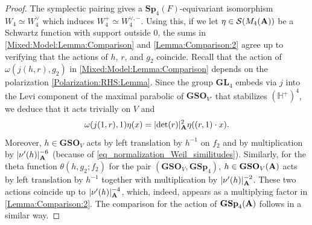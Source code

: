 \documentclass[11pt, reqno]{amsart}
\theoremstyle{plain}
\theoremstyle{definition}
\theoremstyle{remark}
\theoremstyle{plain}
\def\A{{\bf A}}
\def\GSp{{\mathbf{GSp}}}
\def\Sp{{\mathbf{Sp}}}
\def\GL{\mathbf{GL}}
\begin{document}
\begin{proof}
The symplectic pairing gives a $\Sp_4(F)$-equivariant isomorphism $W_4 \simeq W_4^\vee$ which induces $W_4^+ \simeq W_4^{\vee,-}$. Using this, if we let $\eta \in \mathcal{S}(M_4(\A))$ be a Schwartz function with support outside $0$, the sums in  
    \eqref{Mixed:Model:Lemma:Comparison} and \eqref{Lemma:Comparison:2} agree up to verifying that the actions of $h$, $r$, and $g_2$ coincide. Recall that the action of $\omega(j(h,r),g_2)$ in  
    \eqref{Mixed:Model:Lemma:Comparison} depends on the polarization \eqref{Polarization:RHS:Lemma}. Since the group $\GL_4$ embeds via $j$ into the Levi component of the maximal parabolic of $\mathbf{GSO}_{V'}$ that stabilizes $(\mathbb{H}^{+})^4$, we deduce that it acts trivially on $V$ and
    \[\omega(j(1,r),1) \eta(x) = |\mathrm{det}(r)|_{\A}^{2}\eta((r,1) \cdot x ).\] Moreover, $h \in \mathbf{GSO}_V$ acts by left translation by $h^{-1}$ on $f_2$ and by multiplication by $|\nu'(h)|_{\A}^{-6}$ (because of \eqref{eq_normalization_Weil_similitudes}). Similarly, for the theta function $\theta(h,g_2;f_2)$ for the pair $(\mathbf{GSO}_V,\GSp_4)$, $h \in \mathbf{GSO}_V(\A)$ acts by left translation by $h^{-1}$ together with multiplication by $|\nu'(h)|_{\A}^{-2}$. These two actions coincide up to $|\nu'(h)|_{\A}^{-4}$, which, indeed,  appears as a multiplying factor in \eqref{Lemma:Comparison:2}. The comparison for the action of $\GSp_4(\A)$ follows in a similar way. 
\end{proof}
 
\end{document}
